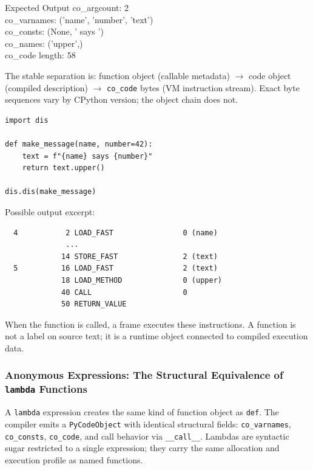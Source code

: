 \documentclass[a4paper,twoside]{report}
\begin{document}
\begin{iobox}{Expected Output}
co\_argcount:    2 \\
co\_varnames:    ('name', 'number', 'text') \\
co\_consts:      (None, ' says ') \\
co\_names:       ('upper',) \\
co\_code length: 58 \\
\end{iobox}




The stable separation is: function object (callable metadata) $\rightarrow$ code object (compiled description) $\rightarrow$ \texttt{co\_code} bytes (VM instruction stream). Exact byte sequences vary by CPython version; the object chain does not.

\begin{verbatim}
import dis

def make_message(name, number=42):
    text = f"{name} says {number}"
    return text.upper()

dis.dis(make_message)
\end{verbatim}

Possible output excerpt:

\begin{verbatim}
  4           2 LOAD_FAST                0 (name)
              ...
             14 STORE_FAST               2 (text)
  5          16 LOAD_FAST                2 (text)
             18 LOAD_METHOD              0 (upper)
             40 CALL                     0
             50 RETURN_VALUE
\end{verbatim}

When the function is called, a frame executes these instructions. A function is not a label on source text; it is a runtime object connected to compiled execution data.

\subsubsection{Anonymous Expressions: The Structural Equivalence of \texttt{lambda} Functions}

A \texttt{lambda} expression creates the same kind of function object as \texttt{def}. The compiler emits a \texttt{PyCodeObject} with identical structural fields: \texttt{co\_varnames}, \texttt{co\_consts}, \texttt{co\_code}, and call behavior via \texttt{\_\_call\_\_}. Lambdas are syntactic sugar restricted to a single expression; they carry the same allocation and execution profile as named functions.
\end{document}
